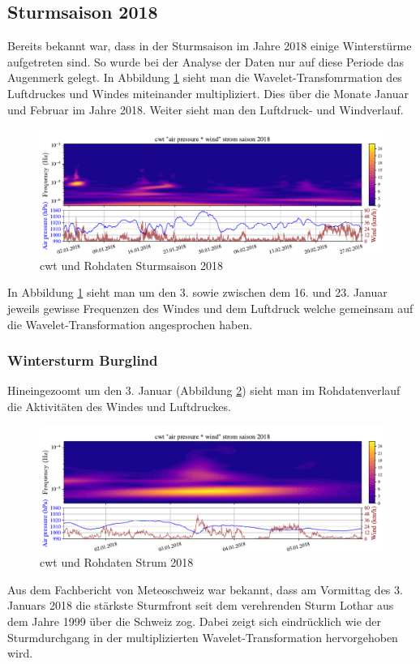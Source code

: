 \begin{refsection}
\subsection{Sturmsaison 2018}
Bereits bekannt war, dass in der Sturmsaison im Jahre 2018 einige Winterstürme aufgetreten sind.
So wurde bei der Analyse der Daten nur auf diese Periode das Augenmerk gelegt. 
In Abbildung \ref{fig:cwt_storm} \space sieht man die Wavelet-Transfomrmation des Luftdruckes und Windes miteinander multipliziert. Dies über die Monate Januar und Februar im Jahre 2018. Weiter sieht man den Luftdruck- und Windverlauf.
 
\begin{figure}[]
	\centering
	\includegraphics[width=1\textwidth]{papers/wwt/images/storm_airp_wind.pdf}
	\caption{cwt und Rohdaten Sturmsaison 2018}
	\label{fig:cwt_storm}
\end{figure}

In Abbildung \ref{fig:cwt_storm} \space sieht man um den 3. sowie zwischen dem 16. und 23. Januar jeweils gewisse Frequenzen des Windes und dem Luftdruck welche gemeinsam auf die Wavelet-Transformation angesprochen haben.

\subsubsection{Wintersturm Burglind}
Hineingezoomt um den 3. Januar (Abbildung \ref{fig:cwt_storm_zoom}) sieht man im Rohdatenverlauf die Aktivitäten des Windes und Luftdruckes. 
\begin{figure}
	\centering
	\includegraphics[width=1\textwidth]{papers/wwt/images/storm_airp_wind_zoom.pdf}
	\caption{cwt und Rohdaten Strum 2018}
	\label{fig:cwt_storm_zoom}
\end{figure}
Aus dem Fachbericht \space \cite{Fachbericht:Burglind} von Meteoschweiz war bekannt, dass am Vormittag des 3. Januars 2018 die stärkste Sturmfront seit dem verehrenden Sturm Lothar aus dem Jahre 1999 über die Schweiz zog.
Dabei zeigt sich eindrücklich wie der Sturmdurchgang in der multiplizierten Wavelet-Transformation hervorgehoben wird.


\end{refsection}

